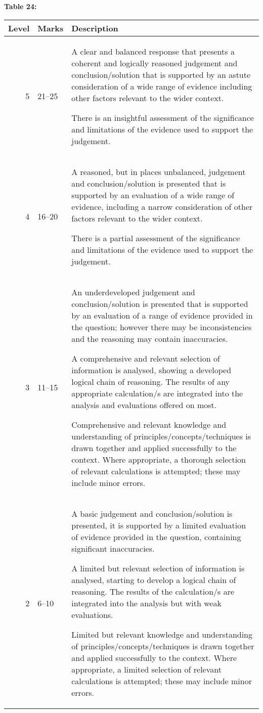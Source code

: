 \documentclass{article}
\begin{document}
\textbf{Table 24:}
\begin{tabular}{rll}
\toprule
Level & Marks & Description \\
\midrule
5 & 21–25 & A clear and balanced response that presents a coherent and logically reasoned
judgement and conclusion/solution that is supported by an astute consideration of a
wide range of evidence including other factors relevant to the wider context.

There is an insightful assessment of the significance and limitations of the evidence
used to support the judgement. \\
4 & 16–20 & A reasoned, but in places unbalanced, judgement and conclusion/solution is
presented that is supported by an evaluation of a wide range of evidence, including a
narrow consideration of other factors relevant to the wider context.

There is a partial assessment of the significance and limitations of the evidence used
to support the judgement. \\
3 & 11–15 & An underdeveloped judgement and conclusion/solution is presented that is
supported by an evaluation of a range of evidence provided in the question; however
there may be inconsistencies and the reasoning may contain inaccuracies.

A comprehensive and relevant selection of information is analysed, showing a
developed logical chain of reasoning.  The results of any appropriate calculation/s
are integrated into the analysis and evaluations offered on most.

Comprehensive and relevant knowledge and understanding of
principles/concepts/techniques is drawn together and applied successfully to the
context.  Where appropriate, a thorough selection of relevant calculations is
attempted; these may include minor errors. \\
2 & 6–10 & A basic judgement and conclusion/solution is presented, it is supported by a limited
evaluation of evidence provided in the question, containing significant inaccuracies.

A limited but relevant selection of information is analysed, starting to develop a
logical chain of reasoning.  The results of the calculation/s are integrated into the
analysis but with weak evaluations.

Limited but relevant knowledge and understanding of principles/concepts/techniques
is drawn together and applied successfully to the context.  Where appropriate, a
limited selection of relevant calculations is attempted; these may include minor
errors. \\
\bottomrule
\end{tabular}
\end{document}
